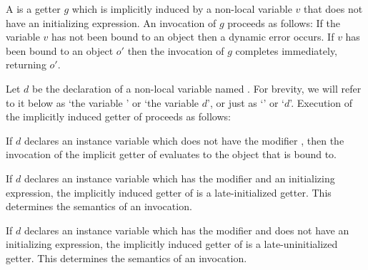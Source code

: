 \documentclass[makeidx]{article}
\begin{document}

\LMHash{}%
A
is a getter $g$ which is implicitly induced by a non-local variable $v$
that does not have an initializing expression.
An invocation of $g$ proceeds as follows:
If the variable $v$ has not been bound to an object then a dynamic error occurs.
If $v$ has been bound to an object $o'$ then
the invocation of $g$ completes immediately, returning $o'$.

\LMHash{}%
%
Let $d$ be the declaration of a non-local variable named \id.
For brevity, we will refer to it below as
`the variable \id' or `the variable $d$', or just as `\id' or `$d$'.
Execution of the implicitly induced getter of \id{} proceeds as follows:

\LMHash{}%
If $d$ declares an instance variable which does not have the modifier \LATE,
then the invocation of the implicit getter of \id{} evaluates to
the object that \id{} is bound to.

\EndCase

\LMHash{}%
If $d$ declares an instance variable \id{} which has the modifier \LATE{}
and an initializing expression,
the implicitly induced getter of \id{} is a
late-initialized getter.
This determines the semantics of an invocation.
\EndCase

\LMHash{}%
If $d$ declares an instance variable \id{} which has the modifier \LATE{}
and does not have an initializing expression,
the implicitly induced getter of \id{} is a
late-uninitialized getter.
This determines the semantics of an invocation.

\EndCase
\end{document}
